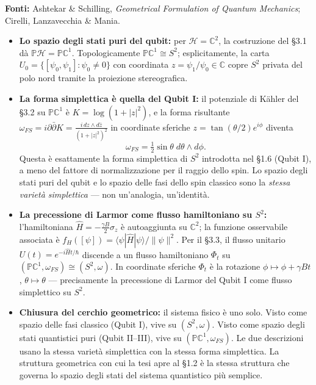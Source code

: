 \documentclass[12pt, a4paper]{article}
\newcommand{\fonti}[1]{%
	\begin{fontebox}
		\textcolor{fontecolor}{\footnotesize\textbf{Fonti:} #1}
	\end{fontebox}%
}
\begin{document}
	\fonti{Ashtekar \& Schilling, \textit{Geometrical Formulation of Quantum Mechanics};
		Cirelli, Lanzavecchia \& Mania.}
	
	\begin{itemize}
		\item \textbf{Lo spazio degli stati puri del qubit:} per $\mathcal{H}=\mathbb{C}^2$,
		la costruzione del \S3.1 dà $\mathbb{P}\mathcal{H}=\mathbb{P}\mathbb{C}^1$.
		Topologicamente $\mathbb{P}\mathbb{C}^1\cong S^2$; esplicitamente, la carta
		$U_0=\{[\psi_0,\psi_1]:\psi_0\neq 0\}$ con coordinata $z=\psi_1/\psi_0\in\mathbb{C}$
		copre $S^2$ privata del polo nord tramite la proiezione stereografica.
		
		\item \textbf{La forma simplettica è quella del Qubit I:}
		il potenziale di Kähler del \S3.2 su $\mathbb{P}\mathbb{C}^1$ è
		$K=\log(1+|z|^2)$, e la forma risultante
		$\omega_{FS}=i\partial\bar\partial K=\frac{i\,dz\wedge d\bar z}{(1+|z|^2)^2}$
		in coordinate sferiche $z=\tan(\theta/2)e^{i\phi}$ diventa
		\[
		\omega_{FS} = \tfrac{1}{2}\sin\theta\;d\theta\wedge d\phi.
		\]
		Questa è esattamente la forma simplettica di $S^2$ introdotta nel \S1.6 (Qubit I),
		a meno del fattore di normalizzazione per il raggio dello spin. Lo spazio degli
		stati puri del qubit e lo spazio delle fasi dello spin classico sono la
		\emph{stessa varietà simplettica} --- non un'analogia, un'identità.
		
		\item \textbf{La precessione di Larmor come flusso hamiltoniano su $S^2$:}
		l'hamiltoniana $\hat H=-\frac{\gamma B}{2}\sigma_z$ è autoaggiunta su
		$\mathbb{C}^2$; la funzione osservabile associata è
		$f_H([\psi])=\langle\psi|\hat H|\psi\rangle/\|\psi\|^2$.
		Per il \S3.3, il flusso unitario $U(t)=e^{-i\hat Ht/\hbar}$ discende a un
		flusso hamiltoniano $\Phi_t$ su $(\mathbb{P}\mathbb{C}^1,\omega_{FS})\cong(S^2,\omega)$.
		In coordinate sferiche $\Phi_t$ è la rotazione $\phi\mapsto\phi+\gamma Bt$,
		$\theta\mapsto\theta$ --- precisamente la precessione di Larmor del Qubit I
		come flusso simplettico su $S^2$.
		
		\item \textbf{Chiusura del cerchio geometrico:} il sistema fisico è uno solo.
		Visto come spazio delle fasi classico (Qubit I), vive su $(S^2,\omega)$.
		Visto come spazio degli stati quantistici puri (Qubit II--III), vive su
		$(\mathbb{P}\mathbb{C}^1,\omega_{FS})$. Le due descrizioni usano la stessa
		varietà simplettica con la stessa forma simplettica. La struttura geometrica
		con cui la tesi apre al \S1.2 è la stessa struttura che governa lo spazio degli
		stati del sistema quantistico più semplice.
	\end{itemize}
	
\end{document}
